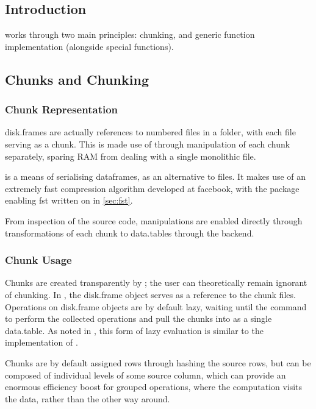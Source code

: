 \subsection{Introduction}\label{sec:disk-frame-introduction}

 works through two main principles: chunking, and generic function implementation (alongside special functions).

\subsection{Chunks and Chunking}\label{sec:chunking}

\subsubsection{Chunk Representation}\label{sec:chunk-representation}

disk.frames are actually references to numbered  files in a folder, with each file serving as a chunk.
This is made use of through manipulation of each chunk separately, sparing RAM from dealing with a single monolithic file\cite{zj19:_inges_data}.

 is a means of serialising dataframes, as an alternative to 
files\cite{klik2022fst}.
It makes use of an extremely fast compression algorithm developed at facebook, with the \R{} package enabling fst written on in \cref{sec:fst}.

From inspection of the source code,  manipulations are enabled directly through transformations of each chunk to data.tables through the  backend.

\subsubsection{Chunk Usage}\label{sec:making-chunks}

Chunks are created transparently by ; the user can theoretically remain ignorant of chunking.
In \R{}, the disk.frame object serves as a reference to the chunk files.
Operations on disk.frame objects are by default lazy, waiting until the  command to perform the collected operations and pull the chunks into \R{} as a single data.table.
As noted in \cite{zj19:_simpl_verbs_lazy_evaluat}, this form of lazy evaluation is similar to the implementation of .

Chunks are by default assigned rows through hashing the source rows, but can be composed of individual levels of some source column, which can provide an enormous efficiency boost for grouped operations, where the computation visits the data, rather than the other way around.

